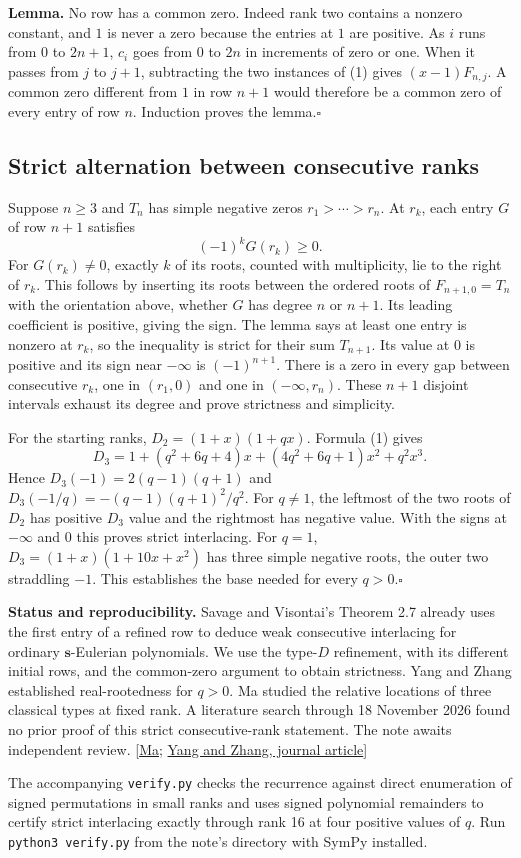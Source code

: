 \documentclass[11pt]{article}
\newcommand{\done}{\hfill\(\square\)}
\begin{document}
\textbf{Lemma.} No row has a common zero. Indeed rank two contains a nonzero constant, and $1$ is never a zero because the entries at $1$ are positive. As $i$ runs from $0$ to $2n+1$, $c_i$ goes from $0$ to $2n$ in increments of zero or one. When it passes from $j$ to $j+1$, subtracting the two instances of (1) gives $(x-1)F_{n,j}$. A common zero different from $1$ in row $n+1$ would therefore be a common zero of every entry of row $n$. Induction proves the lemma.\done

\subsection*{Strict alternation between consecutive ranks}
Suppose $n\ge3$ and $T_n$ has simple negative zeros $r_1>\cdots>r_n$. At $r_k$, each entry $G$ of row $n+1$ satisfies
\[
                     (-1)^k G(r_k)\ge0 .
\]
For $G(r_k)\ne0$, exactly $k$ of its roots, counted with multiplicity, lie to the right of $r_k$. This follows by inserting its roots between the ordered roots of $F_{n+1,0}=T_n$ with the orientation above, whether $G$ has degree $n$ or $n+1$. Its leading coefficient is positive, giving the sign. The lemma says at least one entry is nonzero at $r_k$, so the inequality is strict for their sum $T_{n+1}$. Its value at $0$ is positive and its sign near $-\infty$ is $(-1)^{n+1}$. There is a zero in every gap between consecutive $r_k$, one in $(r_1,0)$ and one in $(-\infty,r_n)$. These $n+1$ disjoint intervals exhaust its degree and prove strictness and simplicity.

For the starting ranks, $D_2=(1+x)(1+qx)$. Formula (1) gives
\[
 D_3=1+(q^2+6q+4)x+(4q^2+6q+1)x^2+q^2x^3.
\]
Hence $D_3(-1)=2(q-1)(q+1)$ and $D_3(-1/q)=-(q-1)(q+1)^2/q^2$. For $q\ne1$, the leftmost of the two roots of $D_2$ has positive $D_3$ value and the rightmost has negative value. With the signs at $-\infty$ and $0$ this proves strict interlacing. For $q=1$, $D_3=(1+x)(1+10x+x^2)$ has three simple negative roots, the outer two straddling $-1$. This establishes the base needed for every $q>0$.\done

\small
\textbf{Status and reproducibility.} Savage and Visontai's Theorem 2.7 already uses the first entry of a refined row to deduce weak consecutive interlacing for ordinary $\mathbf{s}$-Eulerian polynomials. We use the type-$D$ refinement, with its different initial rows, and the common-zero argument to obtain strictness. Yang and Zhang established real-rootedness for $q>0$. Ma studied the relative locations of three classical types at fixed rank. A literature search through 18 November 2026 found no prior proof of this strict consecutive-rank statement. The note awaits independent review. [\href{https://arxiv.org/abs/2608.02357}{Ma}; \href{https://doi.org/10.1137/16M1084651}{Yang and Zhang, journal article}]

The accompanying \texttt{verify.py} checks the recurrence against direct enumeration of signed permutations in small ranks and uses signed polynomial remainders to certify strict interlacing exactly through rank 16 at four positive values of $q$. Run \texttt{python3 verify.py} from the note's directory with SymPy installed.
\end{document}
